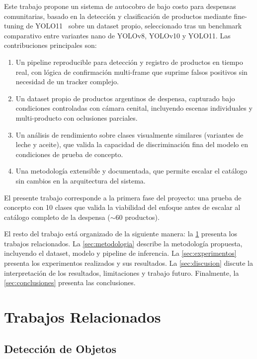 \documentclass[conference,a4paper]{IEEEtran}[2015/08/26]
\begin{document}
Este trabajo propone un sistema de autocobro de bajo costo para despensas comunitarias, basado en la detección y clasificación de productos mediante fine-tuning de YOLO11~\cite{jocher2023ultralytics} sobre un dataset propio, seleccionado tras un benchmark comparativo entre variantes nano de YOLOv8, YOLOv10 y YOLO11. Las contribuciones principales son:
\begin{enumerate}
  \item Un pipeline reproducible para detección y registro de productos en tiempo real, con lógica de confirmación multi-frame que suprime falsos positivos sin necesidad de un tracker complejo.
  \item Un dataset propio de productos argentinos de despensa, capturado bajo condiciones controladas con cámara cenital, incluyendo escenas individuales y multi-producto con oclusiones parciales.
  \item Un análisis de rendimiento sobre clases visualmente similares (variantes de leche y aceite), que valida la capacidad de discriminación fina del modelo en condiciones de prueba de concepto.
  \item Una metodología extensible y documentada, que permite escalar el catálogo sin cambios en la arquitectura del sistema.
\end{enumerate}

El presente trabajo corresponde a la primera fase del proyecto: una prueba de concepto con 10 clases que valida la viabilidad del enfoque antes de escalar al catálogo completo de la despensa ($\sim$60 productos).

El resto del trabajo está organizado de la siguiente manera: la \cref{sec:trabajos-relacionados} presenta los trabajos relacionados. La \cref{sec:metodologia} describe la metodología propuesta, incluyendo el dataset, modelo y pipeline de inferencia. La \cref{sec:experimentos} presenta los experimentos realizados y sus resultados. La \cref{sec:discusion} discute la interpretación de los resultados, limitaciones y trabajo futuro. Finalmente, la \cref{sec:conclusiones} presenta las conclusiones.

\section{Trabajos Relacionados}
\label{sec:trabajos-relacionados}

\subsection{Detección de Objetos}
\end{document}
